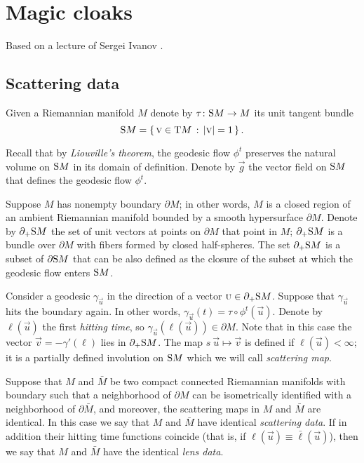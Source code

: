 \chapter{Magic cloaks}

Based on a lecture of Sergei Ivanov \cite{ivanov-2012}.

\section{Scattering data}

Given a Riemannian manifold $M$ denote by $\tau\:\S M\to M$ its unit tangent bundle
\[\S M=\set{\vec v\in \T M}{|\vec v|=1}.\]

Recall that by \emph{Liouville's theorem}, the geodesic flow $\phi^t$ preserves the natural volume on $\S M$ in its domain of definition.
Denote by $\vec g$ the vector field on $\S M$ that defines the geodesic flow $\phi^t$.

Suppose $M$ has nonempty boundary $\partial M$;
in other words, $M$ is a closed region of an ambient Riemannian  manifold bounded by a smooth hypersurface $\partial M$.
Denote by $\partial_+\S  M$ the set of unit vectors at points on $\partial M$ that point in $M$;
$\partial_+\S  M$ is a bundle over $\partial M$ with fibers formed by closed half-spheres.
The set $\partial_+ \S M$ is a subset of $\partial \S M$ that can be also defined as the closure of the subset at which the geodesic flow enters $\S M$.


Consider a geodesic $\gamma_{\vec u}$ in the direction of a vector $\vec u\in \partial_+\S  M$.
Suppose that $\gamma_{\vec u}$ hits the boundary again.
In other words, $\gamma_{\vec u}(t)=\tau\circ \phi^t(\vec u)$.
Denote by $\ell(\vec u)$ the first \emph{hitting time}, so $\gamma_{\vec u}(\ell(\vec u))\in \partial M$.
Note that in this case the vector $\vec v=-\gamma'(\ell)$ lies in $\partial_+\S  M$.
The map $s\:\vec u\mapsto \vec v$ is defined if $\ell(\vec u)<\infty$;
it is a partially defined involution on $\S M$ which we will call \emph{scattering map}.

Suppose that $M$ and $\bar M$ be two compact connected Riemannian manifolds with boundary such that a neighborhood of $\partial M$ can be isometrically identified with a neighborhood of $\partial \bar M$,
and moreover, the scattering maps in $M$ and $\bar M$ are identical.
In this case we say that $M$ and $\bar M$ have identical  \emph{scattering data}.
If in addition their hitting time functions  coincide (that is, if $\ell(\vec u)\equiv\bar\ell(\vec u)$), then we say that $M$ and $\bar M$ have the identical \emph{lens data}.

